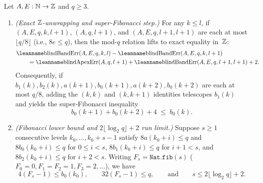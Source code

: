 \begin{theorem}\label{thm:LU}
Let $A, E : \mathbb{N} \to \mathbb{Z}$ and $q \ge 3$.
\begin{enumerate}
\item \emph{(Exact $\mathbb{Z}$-unwrapping and super-Fibonacci step.)} For any $k \le l$, if
  $(A, E, q, k, l+1)$, $(A, q, l+1)$, and
  $(A, E, q, l+1, l+1)$ are each at most $\lfloor q / 8 \rfloor$ (i.e., $8 e \le q$), then the mod-$q$
  relation lifts to exact equality in~$\mathbb{Z}$:
  \begin{align*}
    &\lean{blindBandErr}(A, E, q, k, l) - \lean{blindBandErr}(A, E, q, k, l+1) \\
    &\qquad = \lean{blindApexErr}(A, q, l+1) + \lean{blindBandErr}(A, E, q, l+1, l+1) + 2.
  \end{align*}
  Consequently, if $b_1(k), b_2(k), a(k+1), b_0(k+1), a(k+2), b_0(k+2)$ are each at most $q/8$, adding the $(k, k)$ and
  $(k, k+1)$ identities telescopes $b_1(k)$ and yields the super-Fibonacci inequality
  \begin{equation}\label{eq:super-fib}
    b_0(k+1) + b_0(k+2) + 4 \;\le\; b_0(k).
  \end{equation}
\item \emph{(Fibonacci lower bound and $2\lfloor\log_2 q\rfloor + 2$ run limit.)} Suppose $s \ge 1$ consecutive levels
  $k_0, \dots, k_0 + s - 1$ satisfy $8 a(k_0 + i) \le q$ and $8 b_0(k_0 + i) \le q$ for $0 \le i < s$, $8 b_1(k_0 + i) \le q$
  for $i + 1 < s$, and $8 b_2(k_0 + i) \le q$ for $i + 2 < s$. Writing $F_s = \texttt{Nat.fib}(s)$ ($F_0 = 0, F_1 = F_2 = 1,
  F_3 = 2, \dots$), we have
  \[
    4(F_s - 1) \le b_0(k_0), \qquad 32(F_s - 1) \le q, \qquad\text{and}\qquad s \le 2 \lfloor \log_2 q \rfloor + 2.
  \]
\end{enumerate}
\end{theorem}


